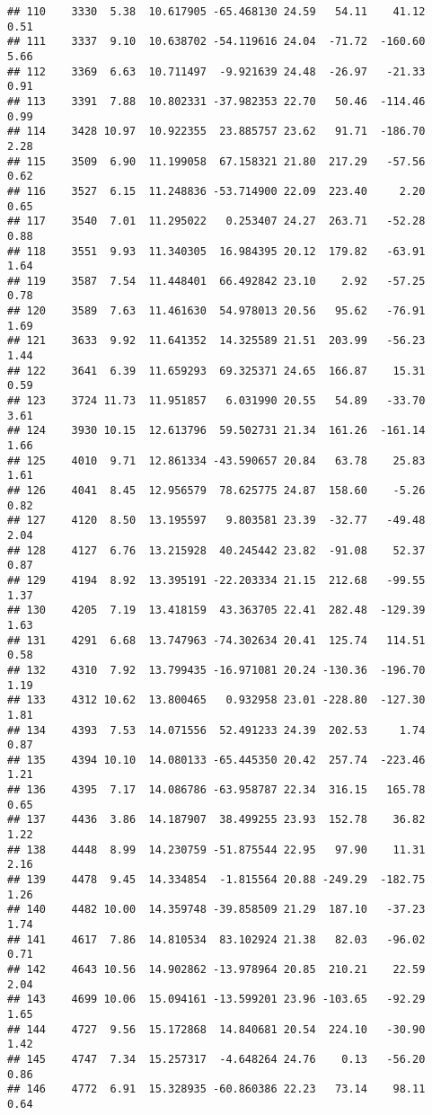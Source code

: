 \documentclass[]{article}
\begin{document}
\begin{verbatim}
## 110    3330  5.38  10.617905 -65.468130 24.59   54.11    41.12  0.51
## 111    3337  9.10  10.638702 -54.119616 24.04  -71.72  -160.60  5.66
## 112    3369  6.63  10.711497  -9.921639 24.48  -26.97   -21.33  0.91
## 113    3391  7.88  10.802331 -37.982353 22.70   50.46  -114.46  0.99
## 114    3428 10.97  10.922355  23.885757 23.62   91.71  -186.70  2.28
## 115    3509  6.90  11.199058  67.158321 21.80  217.29   -57.56  0.62
## 116    3527  6.15  11.248836 -53.714900 22.09  223.40     2.20  0.65
## 117    3540  7.01  11.295022   0.253407 24.27  263.71   -52.28  0.88
## 118    3551  9.93  11.340305  16.984395 20.12  179.82   -63.91  1.64
## 119    3587  7.54  11.448401  66.492842 23.10    2.92   -57.25  0.78
## 120    3589  7.63  11.461630  54.978013 20.56   95.62   -76.91  1.69
## 121    3633  9.92  11.641352  14.325589 21.51  203.99   -56.23  1.44
## 122    3641  6.39  11.659293  69.325371 24.65  166.87    15.31  0.59
## 123    3724 11.73  11.951857   6.031990 20.55   54.89   -33.70  3.61
## 124    3930 10.15  12.613796  59.502731 21.34  161.26  -161.14  1.66
## 125    4010  9.71  12.861334 -43.590657 20.84   63.78    25.83  1.61
## 126    4041  8.45  12.956579  78.625775 24.87  158.60    -5.26  0.82
## 127    4120  8.50  13.195597   9.803581 23.39  -32.77   -49.48  2.04
## 128    4127  6.76  13.215928  40.245442 23.82  -91.08    52.37  0.87
## 129    4194  8.92  13.395191 -22.203334 21.15  212.68   -99.55  1.37
## 130    4205  7.19  13.418159  43.363705 22.41  282.48  -129.39  1.63
## 131    4291  6.68  13.747963 -74.302634 20.41  125.74   114.51  0.58
## 132    4310  7.92  13.799435 -16.971081 20.24 -130.36  -196.70  1.19
## 133    4312 10.62  13.800465   0.932958 23.01 -228.80  -127.30  1.81
## 134    4393  7.53  14.071556  52.491233 24.39  202.53     1.74  0.87
## 135    4394 10.10  14.080133 -65.445350 20.42  257.74  -223.46  1.21
## 136    4395  7.17  14.086786 -63.958787 22.34  316.15   165.78  0.65
## 137    4436  3.86  14.187907  38.499255 23.93  152.78    36.82  1.22
## 138    4448  8.99  14.230759 -51.875544 22.95   97.90    11.31  2.16
## 139    4478  9.45  14.334854  -1.815564 20.88 -249.29  -182.75  1.26
## 140    4482 10.00  14.359748 -39.858509 21.29  187.10   -37.23  1.74
## 141    4617  7.86  14.810534  83.102924 21.38   82.03   -96.02  0.71
## 142    4643 10.56  14.902862 -13.978964 20.85  210.21    22.59  2.04
## 143    4699 10.06  15.094161 -13.599201 23.96 -103.65   -92.29  1.65
## 144    4727  9.56  15.172868  14.840681 20.54  224.10   -30.90  1.42
## 145    4747  7.34  15.257317  -4.648264 24.76    0.13   -56.20  0.86
## 146    4772  6.91  15.328935 -60.860386 22.23   73.14    98.11  0.64

\end{verbatim}
\end{document}
